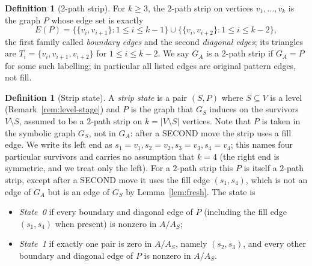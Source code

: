 \documentclass[11pt]{article}
\theoremstyle{plain}
\theoremstyle{definition}
\newtheorem{definition}[theorem]{Definition}
\theoremstyle{remark}
\begin{document}
\begin{aiblock}
\begin{definition}[2-path strip]\label{def:strip}
For $k\ge3$, the $2$-path strip on vertices $v_1,\dots,v_k$ is the graph $P$ whose edge set is exactly
\[
E(P)=\bigl\{\{v_i,v_{i+1}\}:1\le i\le k-1\bigr\}\cup\bigl\{\{v_i,v_{i+2}\}:1\le i\le k-2\bigr\},
\]
the first family called \emph{boundary edges} and the second \emph{diagonal edges}; its triangles are $T_i=\{v_i,v_{i+1},v_{i+2}\}$ for $1\le i\le k-2$. We say $G_A$ is a $2$-path strip if $G_A=P$ for some such labelling; in particular all listed edges are original pattern edges, not fill.
\end{definition}

\begin{definition}[Strip state]\label{def:strip-state}
A \emph{strip state} is a pair $(S,P)$ where $S\subseteq V$ is a level
(Remark~\ref{rem:level-stage}) and $P$ is the graph that $G_S$ induces on the survivors
$V\setminus S$, assumed to be a $2$-path strip on $k=|V\setminus S|$ vertices. Note that $P$ is taken
in the symbolic graph $G_S$, not in $G_A$: after a SECOND move the strip uses a fill edge. We write
its left end as $s_1=v_1,s_2=v_2,s_3=v_3,s_4=v_4$; this names four particular survivors and carries no
assumption that $k=4$ (the right end is symmetric, and we treat only the left). For a $2$-path strip this $P$ is itself a $2$-path strip, except after a SECOND move it uses the fill edge $(s_1,s_4)$, which is not an edge of $G_A$ but is an edge of $G_S$ by Lemma~\ref{lem:fresh}. The state is
\begin{itemize}
\item \emph{State~0} if every boundary and diagonal edge of $P$ (including the fill edge $(s_1,s_4)$ when present) is nonzero in $A/A_S$;
\item \emph{State~1} if exactly one pair is zero in $A/A_S$, namely $(s_2,s_3)$, and every other boundary and diagonal edge of $P$ is nonzero in $A/A_S$.
\end{itemize}
\end{definition}


\end{aiblock}
\end{document}
